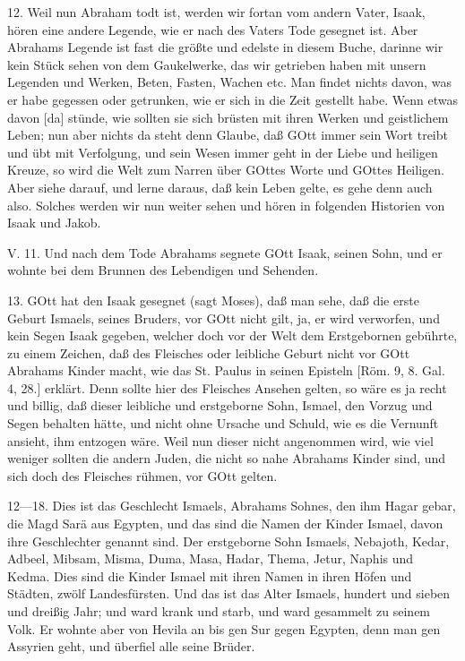 12. Weil nun Abraham todt ist, werden wir fortan vom andern Vater, Isaak, hören eine andere Legende, wie er nach des Vaters Tode gesegnet ist. Aber Abrahams Legende ist fast die größte und edelste in diesem Buche, darinne wir kein Stück sehen von dem Gaukelwerke, das wir getrieben haben mit unsern Legenden und Werken, Beten, Fasten, Wachen etc. Man findet nichts davon, was er habe gegessen oder getrunken, wie er sich in die Zeit gestellt habe. Wenn etwas davon [da] stünde, wie sollten sie sich brüsten mit ihren Werken und geistlichem Leben; nun aber nichts da steht denn Glaube, daß GOtt immer sein Wort treibt und übt mit Verfolgung, und sein Wesen immer geht in der Liebe und heiligen Kreuze, so wird die Welt zum Narren über GOttes Worte und GOttes Heiligen. Aber siehe darauf, und lerne daraus, daß kein Leben gelte, es gehe denn auch also. Solches werden wir nun weiter sehen und hören in folgenden Historien von Isaak und Jakob.
\begin{schriftzitat}
V. 11. Und nach dem Tode Abrahams segnete GOtt Isaak, seinen Sohn, und er wohnte bei dem Brunnen des Lebendigen und Sehenden.
\end{schriftzitat}

13. GOtt hat den Isaak gesegnet (sagt Moses), daß man sehe, daß die erste Geburt Ismaels, seines Bruders, vor GOtt nicht gilt, ja, er wird verworfen, und kein Segen Isaak gegeben, welcher doch vor der Welt dem Erstgebornen gebührte, zu einem Zeichen, daß des Fleisches oder leibliche Geburt nicht vor GOtt Abrahams Kinder macht, wie das St. Paulus in seinen Episteln [Röm. 9, 8. Gal. 4, 28.] erklärt. Denn sollte hier des Fleisches Ansehen gelten, so wäre es ja recht und billig, daß dieser leibliche und erstgeborne Sohn, Ismael, den Vorzug und Segen behalten hätte, und nicht ohne Ursache und Schuld, wie es die Vernunft ansieht, ihm entzogen wäre. Weil nun dieser nicht angenommen wird, wie viel weniger sollten die andern Juden, die nicht so nahe Abrahams Kinder sind, und sich doch des Fleisches rühmen, vor GOtt gelten.

12—18. Dies ist das Geschlecht Ismaels, Abrahams Sohnes, den ihm Hagar gebar, die Magd Sarä aus Egypten, und das sind die Namen der Kinder Ismael, davon ihre Geschlechter genannt sind. Der erstgeborne Sohn Ismaels, Nebajoth, Kedar, Adbeel, Mibsam, Misma, Duma, Masa, Hadar, Thema, Jetur, Naphis und Kedma. Dies sind die Kinder Ismael mit ihren Namen in ihren Höfen und Städten, zwölf Landesfürsten. Und das ist das Alter Ismaels, hundert und sieben und dreißig Jahr; und ward krank und starb, und ward gesammelt zu seinem Volk. Er wohnte aber von Hevila an bis gen Sur gegen Egypten, denn man gen Assyrien geht, und überfiel alle seine Brüder.

